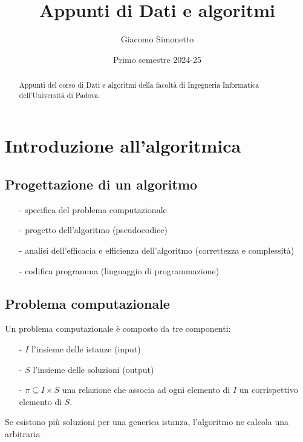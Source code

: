 \documentclass[a4paper]{article}
\title{Appunti di Dati e algoritmi}
\author{Giacomo Simonetto}
\date{Primo semestre 2024-25}
\begin{document}
\maketitle
\begin{abstract}
	Appunti del corso di Dati e algoritmi della facoltà di Ingegneria Informatica dell'Università di Padova.
\end{abstract}

\newpage

\tableofcontents

\newpage

\section{Introduzione all'algoritmica}
\subsection{Progettazione di un algoritmo}
\begin{itemize}[topsep=3pt, itemsep=0pt]
	\item[-] specifica del problema computazionale
	\item[-] progetto dell'algoritmo (pseudocodice)
	\item[-] analisi dell'efficacia e efficienza dell'algoritmo (correttezza e complessità)
	\item[-] codifica programma (linguaggio di programmazione)
\end{itemize}


\subsection{Problema computazionale}
Un problema computazionale è composto da tre componenti:
\begin{itemize}[topsep=3pt, itemsep=0pt]
	\item[-] \(I\) l'insieme delle istanze (input)
	\item[-] \(S\) l'insieme delle soluzioni (output)
	\item[-] \(\pi \subseteq I \times S\) una relazione che associa ad ogni elemento di \(I\) un corrispettivo elemento di \(S\).
\end{itemize}
Se esistono più soluzioni per una generica istanza, l'algoritmo ne calcola una arbitraria
\end{document}
